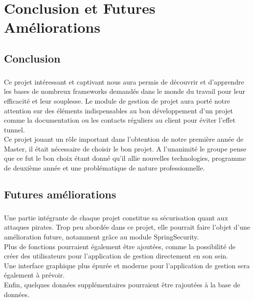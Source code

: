 \chapter{Conclusion et Futures Améliorations}
\section{Conclusion}
\paragraph{}Ce projet intéressant et captivant nous aura permis de découvrir et d'apprendre les bases de nombreux frameworks demandés dans le monde du travail pour leur efficacité et leur souplesse. Le module de gestion de projet aura porté notre attention sur des éléments indispensables au bon développement d'un projet comme la documentation ou les contacts réguliers au client pour éviter l'effet tunnel.\\

Ce projet jouant un rôle important dans l'obtention de notre première année de Master, il était nécessaire de choisir le bon projet. A l'unanimité le groupe pense que ce fut le bon choix étant donné qu'il allie nouvelles technologies, programme de deuxième année et une problématique de nature professionnelle.

\section{Futures améliorations}
\paragraph{} Une partie intégrante de chaque projet constitue sa sécurisation quant aux attaques pirates. Trop peu abordée dans ce projet, elle pourrait faire l'objet d'une amélioration future, notamment grâce au module SpringSecurity.\\
Plus de fonctions pourraient également être ajoutées, comme la possibilité de créer des utilisateurs pour l'application de gestion directement en son sein.\\
Une interface graphique plus épurée et moderne pour l'application de gestion sera également à prévoir.\\
Enfin, quelques données supplémentaires pourraient être rajoutées à la base de données.\\